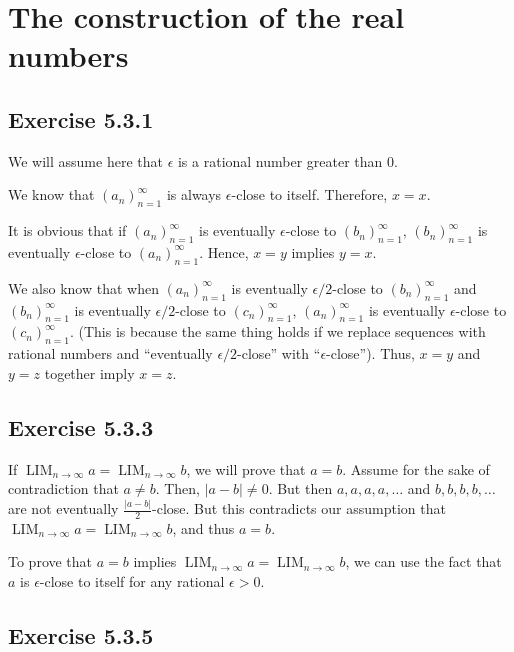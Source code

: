 \documentclass[12pt, oneside]{book}
\DeclareMathOperator*{\formallim}{LIM}
\begin{document}
	\section{The construction of the real numbers}

	\subsection*{Exercise 5.3.1}

	We will assume here that $\epsilon$ is a rational number greater than $0$.

	We know that $(a_n)_{n = 1}^\infty$ is always $\epsilon$-close to itself. Therefore, $x = x$.

	It is obvious that if $(a_n)_{n = 1}^\infty$ is eventually $\epsilon$-close to $(b_n)_{n = 1}^\infty$, $(b_n)_{n = 1}^\infty$ is eventually $\epsilon$-close to $(a_n)_{n = 1}^\infty$. Hence, $x = y$ implies $y = x$.

	We also know that when $(a_n)_{n = 1}^\infty$ is eventually $\epsilon/2$-close to $(b_n)_{n = 1}^\infty$ and $(b_n)_{n = 1}^\infty$ is eventually $\epsilon/2$-close to $(c_n)_{n = 1}^\infty$, $(a_n)_{n = 1}^\infty$ is eventually $\epsilon$-close to $(c_n)_{n = 1}^\infty$. (This is because the same thing holds if we replace sequences with rational numbers and ``eventually $\epsilon/2$-close'' with ``$\epsilon$-close''). Thus, $x = y$ and $y = z$ together imply $x = z$.

	\subsection*{Exercise 5.3.3}

	If $\formallim_{n \to \infty} a = \formallim_{n \to \infty} b$, we will prove that $a = b$. Assume for the sake of contradiction that $a \ne b$. Then, $|a - b| \ne 0$. But then $a, a, a, a, \dotsc$ and $b, b, b, b, \dotsc$ are not eventually $\frac{|a - b|}{2}$-close. But this contradicts our assumption that $\formallim_{n \to \infty} a = \formallim_{n \to \infty} b$, and thus $a = b$.

	To prove that $a = b$ implies $\formallim_{n \to \infty} a = \formallim_{n \to \infty} b$, we can use the fact that $a$ is $\epsilon$-close to itself for any rational $\epsilon > 0$.

	\subsection*{Exercise 5.3.5}
\end{document}
